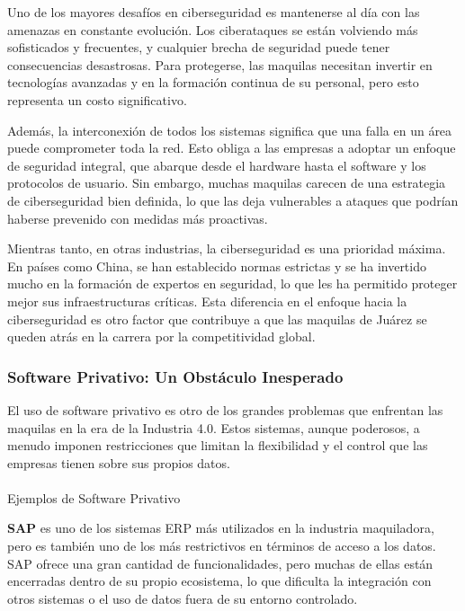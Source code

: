 \documentclass[
  10pt,
  letterpaper,
]{book}
\makeatletter
\let\oldparagraph\paragraph
\renewcommand{\paragraph}{
    \@ifstar
      \xxxParagraphStar
      \xxxParagraphNoStar
  }
\newcommand{\xxxParagraphStar}[1]{\oldparagraph*{#1}\mbox{}}
\newcommand{\xxxParagraphNoStar}[1]{\oldparagraph{#1}\mbox{}}
\makeatother
\begin{document}
Uno de los mayores desafíos en ciberseguridad es mantenerse al día con
las amenazas en constante evolución. Los ciberataques se están volviendo
más sofisticados y frecuentes, y cualquier brecha de seguridad puede
tener consecuencias desastrosas. Para protegerse, las maquilas necesitan
invertir en tecnologías avanzadas y en la formación continua de su
personal, pero esto representa un costo significativo.

Además, la interconexión de todos los sistemas significa que una falla
en un área puede comprometer toda la red. Esto obliga a las empresas a
adoptar un enfoque de seguridad integral, que abarque desde el hardware
hasta el software y los protocolos de usuario. Sin embargo, muchas
maquilas carecen de una estrategia de ciberseguridad bien definida, lo
que las deja vulnerables a ataques que podrían haberse prevenido con
medidas más proactivas.

Mientras tanto, en otras industrias, la ciberseguridad es una prioridad
máxima. En países como China, se han establecido normas estrictas y se
ha invertido mucho en la formación de expertos en seguridad, lo que les
ha permitido proteger mejor sus infraestructuras críticas. Esta
diferencia en el enfoque hacia la ciberseguridad es otro factor que
contribuye a que las maquilas de Juárez se queden atrás en la carrera
por la competitividad global.

\subsubsection{Software Privativo: Un Obstáculo
Inesperado}\label{software-privativo-un-obstuxe1culo-inesperado}

El uso de software privativo es otro de los grandes problemas que
enfrentan las maquilas en la era de la Industria 4.0. Estos sistemas,
aunque poderosos, a menudo imponen restricciones que limitan la
flexibilidad y el control que las empresas tienen sobre sus propios
datos.

\paragraph{Ejemplos de Software
Privativo}\label{ejemplos-de-software-privativo}

\textbf{SAP} es uno de los sistemas ERP más utilizados en la industria
maquiladora, pero es también uno de los más restrictivos en términos de
acceso a los datos. SAP ofrece una gran cantidad de funcionalidades,
pero muchas de ellas están encerradas dentro de su propio ecosistema, lo
que dificulta la integración con otros sistemas o el uso de datos fuera
de su entorno controlado.
\end{document}
